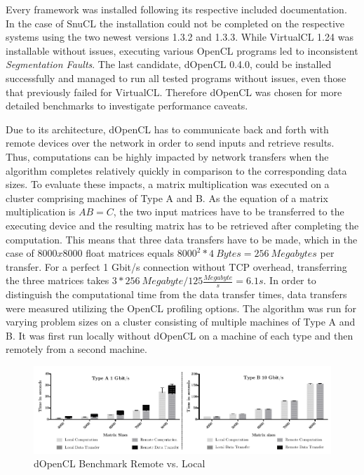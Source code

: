 Every framework was installed following its respective included documentation. In the case of SnuCL the installation could not be completed on the respective systems using the two newest versions 1.3.2 and 1.3.3. While VirtualCL 1.24 was installable without issues, executing various OpenCL programs led to inconsistent \textit{Segmentation Faults}. The last candidate, dOpenCL 0.4.0, could be installed successfully and managed to run all tested programs without issues, even those that previously failed for VirtualCL. Therefore dOpenCL was chosen for more detailed benchmarks to investigate performance caveats.

Due to its architecture, dOpenCL has to communicate back and forth with remote devices over the network in order to send inputs and retrieve results. Thus, computations can be highly impacted by network transfers when the algorithm completes relatively quickly in comparison to the corresponding data sizes. To evaluate these impacts, a matrix multiplication was executed on a cluster comprising machines of Type A and B. As the equation of a matrix multiplication is $AB = C$, the two input matrices have to be transferred to the executing device and the resulting matrix has to be retrieved after completing the computation. This means that three data transfers have to be made, which in the case of $8000x8000$ float matrices equals $8000^2 * 4\ Bytes = 256\ Megabytes$ per transfer. For a perfect 1 Gbit/s connection without TCP overhead, transferring the three matrices takes $3*256\ Megabyte / 125\frac{Megabyte}{s} = 6.1s$. In order to distinguish the computational time from the data transfer times, data transfers were measured utilizing the OpenCL profiling options. The algorithm was run for varying problem sizes on a cluster consisting of multiple machines of Type A and B. It was first run locally without dOpenCL on a machine of each type and then remotely from a second machine.

\begin{figure}[!htb]

\includegraphics[width=1.0\textwidth]{images/data_transfer.pdf}
\centering
\caption{dOpenCL Benchmark Remote vs. Local}
\label{img:data_transfer}
\end{figure}


